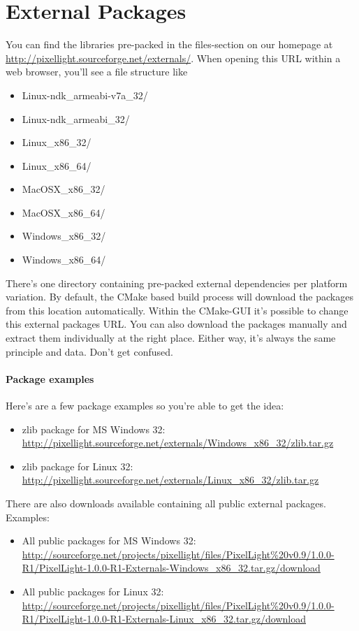\section{External Packages}
You can find the libraries pre-packed in the files-section on our homepage at \url{http://pixellight.sourceforge.net/externals/}. When opening this \ac{URL} within a web browser, you'll see a file structure like
\begin{itemize}
\item{Linux-ndk\_armeabi-v7a\_32/}
\item{Linux-ndk\_armeabi\_32/}
\item{Linux\_x86\_32/}
\item{Linux\_x86\_64/}
\item{MacOSX\_x86\_32/}
\item{MacOSX\_x86\_64/}
\item{Windows\_x86\_32/}
\item{Windows\_x86\_64/}
\end{itemize}
There's one directory containing pre-packed external dependencies per platform variation. By default, the CMake based build process will download the packages from this location automatically. Within the CMake-GUI it's possible to change this external packages \ac{URL}. You can also download the packages manually and extract them individually at the right place. Either way, it's always the same principle and data. Don't get confused.


\paragraph{Package examples}
Here's are a few package examples so you're able to get the idea:
\begin{itemize}
\item{zlib package for \ac{MS} Windows \SI{32}{\bit}: \url{http://pixellight.sourceforge.net/externals/Windows_x86_32/zlib.tar.gz}}
\item{zlib package for Linux \SI{32}{\bit}: \url{http://pixellight.sourceforge.net/externals/Linux_x86_32/zlib.tar.gz}}
\end{itemize}

There are also downloads available containing all public external packages. Examples:
\begin{itemize}
\item{All public packages for \ac{MS} Windows \SI{32}{\bit}: \url{http://sourceforge.net/projects/pixellight/files/PixelLight%20v0.9/1.0.0-R1/PixelLight-1.0.0-R1-Externals-Windows_x86_32.tar.gz/download}}
\item{All public packages for Linux \SI{32}{\bit}: \url{http://sourceforge.net/projects/pixellight/files/PixelLight%20v0.9/1.0.0-R1/PixelLight-1.0.0-R1-Externals-Linux_x86_32.tar.gz/download}}
\end{itemize}


